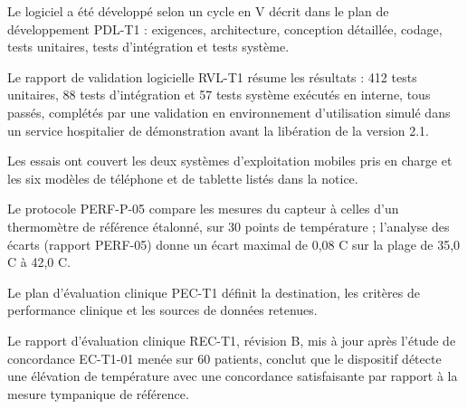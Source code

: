 \documentclass[11pt,a4paper]{article}
\begin{document}
\begin{Form}
\par{}\par

{\small Le logiciel a été développé selon un cycle en V décrit dans le plan de développement PDL-T1 : exigences, architecture, conception détaillée, codage, tests unitaires, tests d'intégration et tests système.}\par

{\small Le rapport de validation logicielle RVL-T1 résume les résultats : 412 tests unitaires, 88 tests d'intégration et 57 tests système exécutés en interne, tous passés, complétés par une validation en environnement d'utilisation simulé dans un service hospitalier de démonstration avant la libération de la version 2.1.}\par

{\small Les essais ont couvert les deux systèmes d'exploitation mobiles pris en charge et les six modèles de téléphone et de tablette listés dans la notice.}\par

\par{}\par

{\small Le protocole PERF-P-05 compare les mesures du capteur à celles d'un thermomètre de référence étalonné, sur 30 points de température ; l'analyse des écarts (rapport PERF-05) donne un écart maximal de 0,08 \textdegree{}C sur la plage de 35,0 \textdegree{}C à 42,0 \textdegree{}C.}\par

\par{}\par

{\small Le plan d'évaluation clinique PEC-T1 définit la destination, les critères de performance clinique et les sources de données retenues.}\par

{\small Le rapport d'évaluation clinique REC-T1, révision B, mis à jour après l'étude de concordance EC-T1-01 menée sur 60 patients, conclut que le dispositif détecte une élévation de température avec une concordance satisfaisante par rapport à la mesure tympanique de référence.}\par

\par{}\par


\end{Form}
\end{document}
